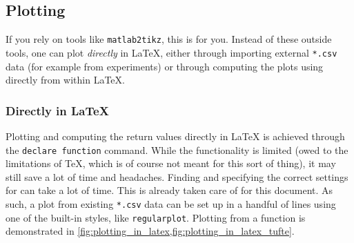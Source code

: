 \subsection{Plotting}

If you rely on tools like \texttt{matlab2tikz}, this is for you.
Instead of these outside tools, one can plot \emph{directly} in \LaTeX{}, either
through importing external \texttt{*.csv} data (for example from experiments)
or through computing the plots using  directly from within
\LaTeX{}.

\subsubsection{Directly in \LaTeX{}}
Plotting and computing the return values directly in \LaTeX{} is achieved through
the \texttt{declare function} command.
While the functionality is limited (owed to the limitations of \TeX{}, which is
of course not meant for this sort of thing),
it may still save a lot of time and headaches.
Finding and specifying the correct settings for  can take
a lot of time.
This is already taken care of for this document.
As such, a plot from existing \texttt{*.csv} data can be set up in a handful of
lines using one of the built-in styles, like \texttt{regularplot}.
Plotting from a  function is demonstrated in
\cref{fig:plotting_in_latex,fig:plotting_in_latex_tufte}.

